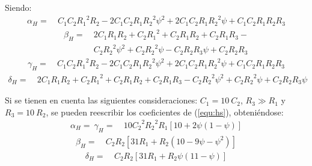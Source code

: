 \documentclass[a4paper]{article}
\begin{document}
Siendo: 
\begin{equation*}
\begin{split}
	\alpha_H =\ & C_{1} C_{2} {R_{1}}^{2} R_{2} - 2 C_{1} C_{2} R_{1} {R_{2}}^{2} \psi^{2} + 2 C_{1} C_{2} R_{1} {R_{2}}^{2} \psi + C_{1} C_{2} R_{1} R_{2} R_{3}
\end{split}
\end{equation*}
\begin{equation*}
\begin{split}
	\beta_H =\ & 2 C_{1} R_{1} R_{2} + C_{2} {R_{1}}^{2} + C_{2} R_{1} R_{2} + C_{2} R_{1} R_{3} -\\ & C_{2} {R_{2}}^{2} \psi^{2} + C_{2} {R_{2}}^{2} \psi - C_{2} R_{2} R_{3} \psi + C_{2} R_{2} R_{3}
\end{split}
\end{equation*}
\begin{equation*}
\begin{split}
	\gamma_H =\ & C_{1} C_{2} {R_{1}}^{2} R_{2} - 2 C_{1} C_{2} R_{1} {R_{2}}^{2} \psi^{2} + 2 C_{1} C_{2} R_{1} {R_{2}}^{2} \psi + C_{1} C_{2} R_{1} R_{2} R_{3}
\end{split}
\end{equation*}
\begin{equation*}
\begin{split}
 \delta_H =\ & 2 C_{1} R_{1} R_{2} + C_{2} {R_{1}}^{2} + C_{2} R_{1} R_{2} + C_{2} R_{1} R_{3} - C_{2} {R_{2}}^{2} \psi^{2} + C_{2} {R_{2}}^{2} \psi + C_{2} R_{2} R_{3} \psi
\end{split}
\end{equation*}

Si se tienen en cuenta las siguientes consideraciones: $C_1 = 10 \ C_2$, $R_3 \gg R_1$ y $R_3 = 10 \ R_2$, se pueden reescribir los coeficientes de (\ref{equ:hs}), obteniéndose: 
\begin{equation*}
\begin{split}
	\alpha_H =\ \gamma_H =\ & 10 {C_{2}}^{2} {R_{2}}^{2} R_{1} \left[ 10 + 2 \psi \left(1 - \psi \right) \right]
\end{split}
\end{equation*}
\begin{equation*}
\begin{split}
	\beta_H =\ & C_{2} R_{2} \left[ 31 R_1 + R_2 \left(10 - 9 \psi - \psi^2 \right) \right]
\end{split}
\end{equation*}
\begin{equation*}
\begin{split}
 \delta_H =\ & C_{2} R_{2} \left[ 31 R_1 + R_2 \psi \left(11 - \psi \right) \right]
\end{split}
\end{equation*}
\end{document}
